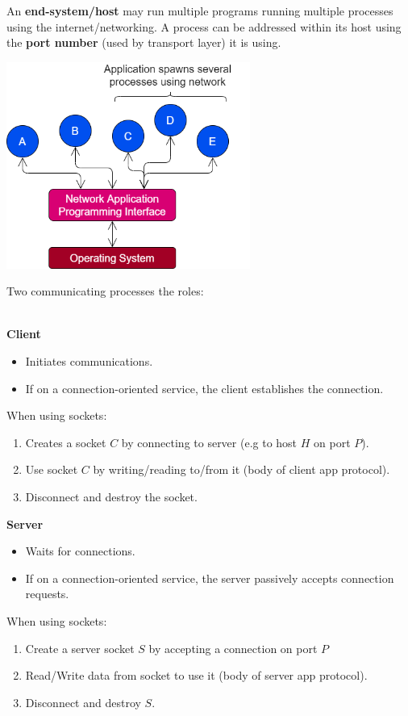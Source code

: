 An \textbf{end-system/host} may run multiple programs running multiple processes using the internet/networking. A process can be addressed within its host using the \textbf{port number} (used by transport layer) it is using.
\begin{center}\includegraphics[width=0.6\textwidth]{the_web/images/processes.png}\end{center}
Two communicating processes the roles:
\\
\\ \begin{minipage}[t]{0.48\textwidth}
    \centerline{\textbf{Client}}
    \begin{itemize}
        \setlength\itemsep{0em}
        \item Initiates communications.
        \item If on a connection-oriented service, the client establishes the connection.
    \end{itemize}

    When using sockets:
    \begin{enumerate}
        \setlength\itemsep{0em}
        \item Creates a socket $C$ by connecting to server (e.g to host $H$ on port $P$).
        \item Use socket $C$ by writing/reading to/from it (body of client app protocol).
        \item Disconnect and destroy the socket.
    \end{enumerate}
\end{minipage}
\hfill
\begin{minipage}[t]{0.48\textwidth}
    \centerline{\textbf{Server}}
    \begin{itemize}
        \setlength\itemsep{0em}
        \item Waits for connections.
        \item If on a connection-oriented service, the server passively accepts connection requests.
    \end{itemize}
    When using sockets:
    \begin{enumerate}
        \setlength\itemsep{0em}
        \item Create a server socket $S$ by accepting a connection on port $P$
        \item Read/Write data from socket to use it (body of server app protocol).
        \item Disconnect and destroy $S$.
    \end{enumerate}
\end{minipage}
